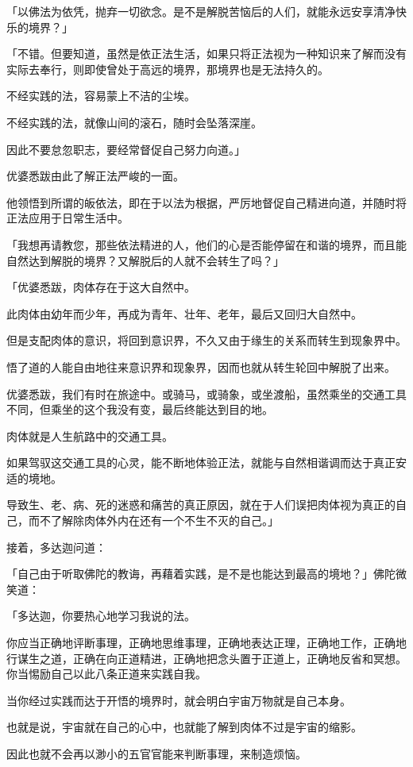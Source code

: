 \documentclass[twoside,openany]{book}
\begin{document}
「以佛法为依凭，抛弃一切欲念。是不是解脱苦恼后的人们，就能永远安享清净快乐的境界？」

「不错。但要知道，虽然是依正法生活，如果只将正法视为一种知识来了解而没有实际去奉行，则即使曾处于高远的境界，那境界也是无法持久的。

不经实践的法，容易蒙上不洁的尘埃。

不经实践的法，就像山间的滚石，随时会坠落深崖。

因此不要怠忽职志，要经常督促自己努力向道。」

优婆悉跋由此了解正法严峻的一面。

他领悟到所谓的皈依法，即在于以法为根据，严厉地督促自己精进向道，并随时将正法应用于日常生活中。

「我想再请教您，那些依法精进的人，他们的心是否能停留在和谐的境界，而且能自然达到解脱的境界？又解脱后的人就不会转生了吗？」

「优婆悉跋，肉体存在于这大自然中。

此肉体由幼年而少年，再成为青年、壮年、老年，最后又回归大自然中。

但是支配肉体的意识，将回到意识界，不久又由于缘生的关系而转生到现象界中。

悟了道的人能自由地往来意识界和现象界，因而也就从转生轮回中解脱了出来。

优婆悉跋，我们有时在旅途中。或骑马，或骑象，或坐渡船，虽然乘坐的交通工具不同，但乘坐的这个我没有变，最后终能达到目的地。

肉体就是人生航路中的交通工具。

如果驾驭这交通工具的心灵，能不断地体验正法，就能与自然相谐调而达于真正安适的境地。

导致生、老、病、死的迷惑和痛苦的真正原因，就在于人们误把肉体视为真正的自己，而不了解除肉体外内在还有一个不生不灭的自己。」

接着，多达迦问道：

「自己由于听取佛陀的教诲，再藉着实践，是不是也能达到最高的境地？」佛陀微笑道：

「多达迦，你要热心地学习我说的法。

你应当正确地评断事理，正确地思维事理，正确地表达正理，正确地工作，正确地行谋生之道，正确在向正道精进，正确地把念头置于正道上，正确地反省和冥想。你当惕励自己以此八条正道来实践自我。

当你经过实践而达于开悟的境界时，就会明白宇宙万物就是自己本身。

也就是说，宇宙就在自己的心中，也就能了解到肉体不过是宇宙的缩影。

因此也就不会再以渺小的五官官能来判断事理，来制造烦恼。
\end{document}
